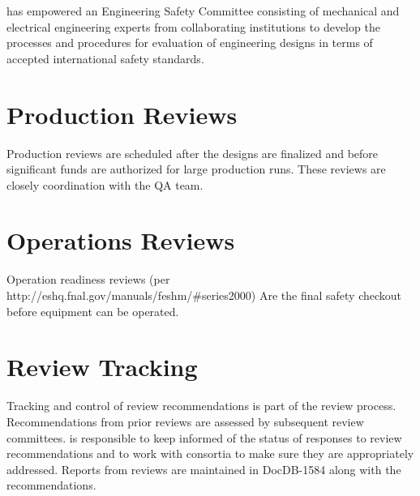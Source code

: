  has empowered an Engineering Safety Committee consisting of
mechanical and electrical engineering experts from collaborating
institutions to develop the processes and procedures for evaluation of
engineering designs in terms of accepted international safety
standards.

\section{Production Reviews}

Production reviews are scheduled after the designs are finalized and
before significant funds are authorized for large production
runs. These reviews are closely coordination with the QA team.

\section{Operations Reviews}

Operation readiness reviews (per
http://eshq.fnal.gov/manuals/feshm/\#series2000) Are the final safety
checkout before equipment can be operated.

\section{Review Tracking}

Tracking and control of review recommendations is part of the review
process. Recommendations from prior reviews are assessed by subsequent
review committees.  is responsible to keep informed of the
status of responses to review recommendations and to work with
consortia to make sure they are appropriately addressed. Reports from
 reviews are maintained in DocDB-1584 along with the
recommendations.

